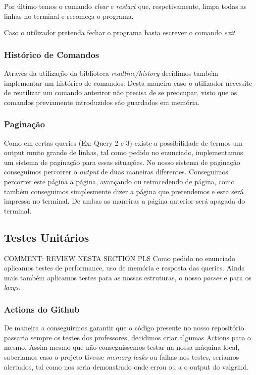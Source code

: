 \documentclass{article}
\begin{document}
            Por último temos o comando \emph{clear} e \emph{restart} que, respetivamente, limpa todas as
            linhas no terminal e recomeça o programa.

            Caso o utilizador pretenda fechar o programa basta escrever o comando \emph{exit}.
            
        \subsubsection{Histórico de Comandos}
            Através da utilização da biblioteca \emph{readline/history} decidimos também implementar um 
            histórico de comandos. Desta maneira caso o utilizador necessite de reutilizar um comando 
            anteriror não precisa de se preocupar, visto que os comandos previamente introduzidos são 
            guardados em memória.
        \subsubsection{Paginação}
            Como em certas queries (Ex: Query 2 e 3) existe a possibilidade de termos um output muito 
            grande de linhas, tal como pedido no enunciado, implementamos um sistema de paginação para
            essas situações. No nosso sistema de paginação conseguimos percorrer o \emph{output} de duas 
            maneiras diferentes. Conseguimos percorrer este página a página, avançando ou retrocedendo de
            página, como também conseguimos simplesmente dizer a página que pretendemos e esta será impressa 
            no terminal. De ambas as maneiras a página anterior será apagada do terminal.
    \subsection{Testes Unitários}
            COMMENT: REVIEW NESTA SECTION PLS
            Como pedido no enunciado aplicamos testes de performance, uso de memória e resposta das queries.
            Ainda mais também aplicamos testes para as nossas estruturas, o nosso \emph{parser} e para os \emph{
            lazys}.
        \subsubsection{Actions do Github}
            De maneira a conseguirmos garantir que o código presente no nosso repositório passaria sempre os
            testes dos professores, decidimos criar algumas Actions para o mesmo. Assim mesmo que não
            conseguissemos testar na nossa máquina local, saberiamos caso o projeto tivesse \emph{memory
            leaks} ou falhas nos testes, seriamos alertados, tal como nos seria demonstrado onde errou ou a o
            output do valgrind.
\end{document}
